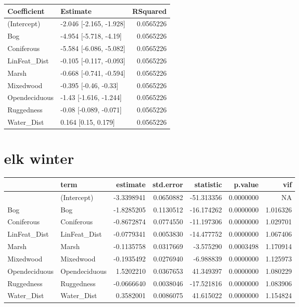 \documentclass[]{article}
\begin{document}
\begin{tabular}{llr}
\toprule
Coefficient & Estimate & RSquared\\
\midrule
(Intercept) & -2.046 [-2.165, -1.928] & 0.0565226\\
Bog & -4.954 [-5.718, -4.19] & 0.0565226\\
Coniferous & -5.584 [-6.086, -5.082] & 0.0565226\\
LinFeat\_Dist & -0.105 [-0.117, -0.093] & 0.0565226\\
Marsh & -0.668 [-0.741, -0.594] & 0.0565226\\
Mixedwood & -0.395 [-0.46, -0.33] & 0.0565226\\
Opendeciduous & -1.43 [-1.616, -1.244] & 0.0565226\\
Ruggedness & -0.08 [-0.089, -0.071] & 0.0565226\\
Water\_Dist & 0.164 [0.15, 0.179] & 0.0565226\\
\bottomrule
\end{tabular}

\section{elk winter}\label{elk-winter}

\begin{tabular}{llrrrrr}
\toprule
  & term & estimate & std.error & statistic & p.value & vif\\
\midrule
 & (Intercept) & -3.3398941 & 0.0650882 & -51.313356 & 0.0000000 & NA\\
Bog & Bog & -1.8285205 & 0.1130512 & -16.174262 & 0.0000000 & 1.016326\\
Coniferous & Coniferous & -0.8672874 & 0.0774550 & -11.197306 & 0.0000000 & 1.029701\\
LinFeat\_Dist & LinFeat\_Dist & -0.0779341 & 0.0053830 & -14.477752 & 0.0000000 & 1.067406\\
Marsh & Marsh & -0.1135758 & 0.0317669 & -3.575290 & 0.0003498 & 1.170914\\
Mixedwood & Mixedwood & -0.1935492 & 0.0276940 & -6.988839 & 0.0000000 & 1.125973\\
Opendeciduous & Opendeciduous & 1.5202210 & 0.0367653 & 41.349397 & 0.0000000 & 1.080229\\
Ruggedness & Ruggedness & -0.0666640 & 0.0038046 & -17.521816 & 0.0000000 & 1.083906\\
Water\_Dist & Water\_Dist & 0.3582001 & 0.0086075 & 41.615022 & 0.0000000 & 1.154824\\
\bottomrule
\end{tabular}
\end{document}
